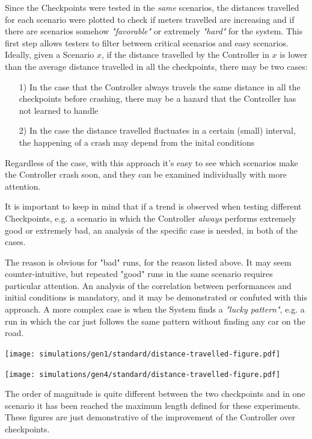 Since the Checkpoints were tested in the \textsl{same} scenarios, the distances travelled for each scenario were plotted to check if meters travelled are increasing and if there are scenarios somehow \textsl{"favorable"} or extremely \textsl{"hard"} for the system. This first step allows testers to filter between critical scenarios and easy scenarios. Ideally, given a Scenario $x$, if the distance travelled by the Controller in $x$ is lower than the average distance travelled in all the checkpoints, there may be two cases:

\begin{itemize}
	\item[1)] In the case that the Controller always travels the same distance in all the checkpoints before crashing, there may be a hazard that the Controller has not learned to handle
	\item[2)] In the case the distance travelled fluctuates in a certain (small) interval, the happening of a crash may depend from the inital conditions
\end{itemize}

Regardless of the case, with this approach it's easy to see which scenarios make the Controller crash soon, and they can be examined individually with more attention.

It is important to keep in mind that if a trend is observed when testing different Checkpoints, e.g. a scenario in which the Controller \textsl{always} performs extremely good or extremely bad, an analysis of the specific case is needed, in both of the cases.

The reason is obvious for "bad" runs, for the reason listed above. It may seem counter-intuitive, but repeated "good" runs in the same scenario requires particular attention. An analysis of the correlation between performances and initial conditions is mandatory, and it may be demonstrated or confuted with this approach. A more complex case is when the System finds a \textsl{"lucky pattern"}, e.g. a run in which the car just follows the same pattern without finding any car on the road. 

\begin{minipage}[c]{\textwidth}
	\texttt{[image: simulations/gen1/standard/distance-travelled-figure.pdf]}

	\texttt{[image: simulations/gen4/standard/distance-travelled-figure.pdf]}

\vspace{0.5cm}
The order of magnitude is quite different between the two checkpoints and in one scenario it has been reached the maximum length defined for these experiments. These figures are just demonstrative of the improvement of the Controller over checkpoints.
\end{minipage}

